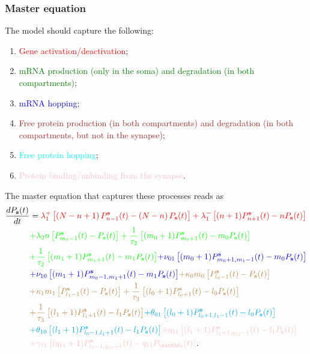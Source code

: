 \documentclass[a4paper, 11pt]{article}
\begin{document}
\subsubsection{Master equation}
The model should capture the following:
\begin{enumerate}
\item \textcolor{red}{Gene activation/deactivation};
\item \textcolor{green}{mRNA production (only in the soma) and degradation (in both compartments)};
\item \textcolor{blue}{mRNA hopping};
\item \textcolor{brown}{Free protein production (in both compartments) and degradation (in both compartments, but not in the synapse)};
\item \textcolor{cyan}{Free protein hopping};
\item \textcolor{pink}{Protein binding/unbinding from the synapse}.
\end{enumerate}
The master equation that captures these processes reads as
\begin{equation*}
  \begin{split}
    \frac{dP_{\mathbf s}(t)}{dt} &= \textcolor{red}{\lambda_1^+\left[\left(N-n+1\right)P_{n-1}^{\mathbf s}(t) - \left(N-n\right)P_{\mathbf s}(t)\right] + \lambda_1^-\left[(n+1)P^{\mathbf s}_{n+1}(t) - nP_{\mathbf s}(t)\right]}\\
    & \textcolor{green}{+ \lambda_2n\left[P^{\mathbf s}_{m_0-1}(t) - P_{\mathbf s}(t)\right] + \frac{1}{\tau_2}\left[(m_0+1)P^{\mathbf s}_{m_0+1}(t) - m_0P_{\mathbf s}(t)\right]}\\ &\textcolor{green}{+ \frac{1}{\tau_2}\left[(m_1+1)P^{\mathbf s}_{m_1+1}(t) - m_1P_{\mathbf s}(t)\right]} \textcolor{blue}{+ \nu_{01}\left[(m_0+1)P^{\mathbf s}_{m_0+1,m_1-1}(t) - m_0P_{\mathbf s}(t)\right]}\\
    &\textcolor{blue}{+ \nu_{10}\left[(m_1+1)P^{\mathbf s}_{m_0-1,m_1+1}(t) - m_1P_{\mathbf s}(t)\right]} \textcolor{brown}{+ \kappa_0m_0\left[P^{\mathbf s}_{l_0-1}(t) - P_{\mathbf s}(t)\right]}\\
    &\textcolor{brown}{+ \kappa_1m_1\left[P^{\mathbf s}_{l_1-1}(t) - P_{\mathbf s}(t)\right] + \frac{1}{\tau_3}\left[(l_0+1)P^{\mathbf s}_{l_0+1}(t) - l_0P_{\mathbf s}(t)\right]}\\&\textcolor{brown}{+ \frac{1}{\tau_3}\left[(l_1+1)P^{\mathbf s}_{l_1+1}(t)-l_1P_{\mathbf s}(t)\right]} \textcolor{cyan}{+ \theta_{01}\left[(l_0+1)P^{\mathbf s}_{l_0+1,l_1-1}(t) - l_0P_{\mathbf s}(t)\right]}\\
    &\textcolor{cyan}{+ \theta_{10}\left[(l_1+1)P^{\mathbf s}_{l_0-1,l_1+1}(t) - l_1P_{\mathbf s}(t)\right]} \textcolor{pink}{+\eta_{11}\left[(l_1+1)P^{\mathbf s}_{l_1+1, q_{11}-1}(t) - l_1P_{\mathbf s}(t)\right]} \\
    &\textcolor{pink}{+ \gamma_{11}\left[(q_{11}+1)P^{\mathbf s}_{l_1-1,q_{11}+1}(t) - q_{11}P_{\mathbd s}(t)\right]}.
  \end{split}
\end{equation*}
\end{document}
